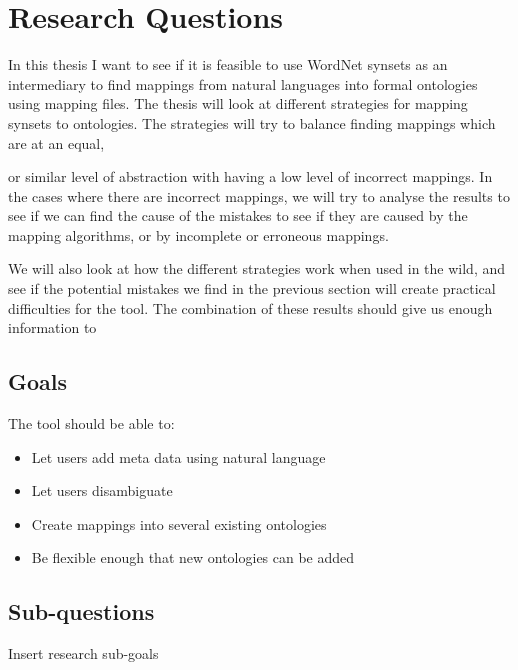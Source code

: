 \section{Research Questions}
In this thesis I want to see if it is feasible to use WordNet synsets as an intermediary 
to find mappings from natural languages into formal ontologies using mapping files.
The thesis will look at different strategies for mapping synsets to ontologies. 
The strategies will try to balance finding mappings which are at an equal, 

or similar level of abstraction with having a low level of incorrect mappings.
In the cases where there are incorrect mappings, 
we will try to analyse the results to see if we can find the cause of the mistakes to see if they are caused by the 
mapping algorithms, or by incomplete or erroneous mappings.

We will also look at how the different strategies work when used in the wild, 
and see if the potential mistakes we find
in the previous section will create practical difficulties for the tool. 
The combination of these results should give us enough information to 
\subsection{Goals}

The tool should be able to:
\begin{itemize}
	\item Let users add meta data using natural language
	\item Let users disambiguate
	\item Create mappings into several existing ontologies
	\item Be flexible enough that new ontologies can be added
\end{itemize}

\subsection{Sub-questions}
Insert research sub-goals
